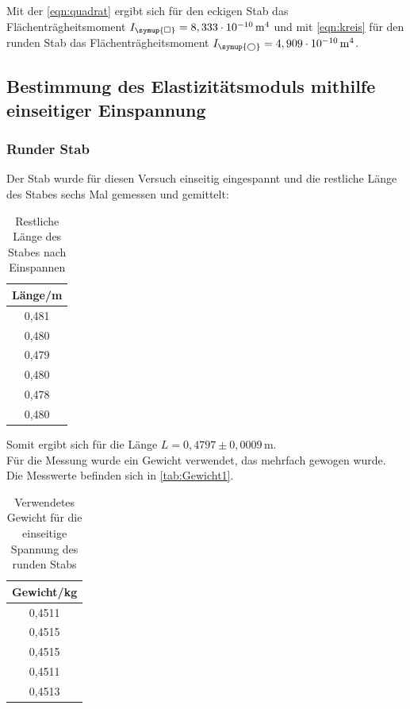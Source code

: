   Mit der \autoref{eqn:quadrat} ergibt sich für den eckigen Stab das Flächenträgheitsmoment $I_{\symup{\square}} = 8,333 \cdot 10^{-10} \, \mathrm{m^4}$ und mit \autoref{eqn:kreis} für den 
  runden Stab das Flächenträgheitsmoment $I_{\symup{\bigcirc}} = 4,909 \cdot 10^{-10} \, \mathrm{m^4}$.\\

\subsection{Bestimmung des Elastizitätsmoduls mithilfe einseitiger Einspannung}

\subsubsection{Runder Stab}
  Der Stab wurde für diesen Versuch einseitig eingespannt und die restliche Länge des Stabes sechs Mal gemessen und gemittelt:

  \begin{table}
    \centering
    \caption{Restliche Länge des Stabes nach Einspannen}
    \label{tab:einseitig_runder_Laenge}
    \begin{tabular}{c}
      \toprule
      Länge/m \\
      \midrule
      0,481 \\
      0,480 \\
      0,479 \\
      0,480 \\
      0,478 \\
      0,480 \\
      \bottomrule
    \end{tabular}
  \end{table}

  Somit ergibt sich für die Länge $L = 0{,}4797 \pm 0,0009 \, \mathrm{m}$.\\

  Für die Messung wurde ein Gewicht verwendet, das mehrfach gewogen wurde. Die Messwerte befinden sich in \autoref{tab:Gewicht1}.

  \begin{table}
    \centering
    \caption{Verwendetes Gewicht für die einseitige Spannung des runden Stabs}
    \label{tab:Gewicht1}
    \begin{tabular}{c}
      \toprule
      Gewicht/kg \\
      \midrule
      0,4511 \\
      0,4515 \\
      0,4515 \\
      0,4511 \\
      0,4513 \\
      \bottomrule
    \end{tabular}
  \end{table}

